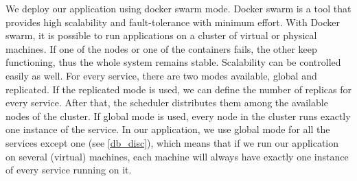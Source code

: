 We deploy our application using docker swarm mode. Docker swarm is a tool that provides high scalability and fault-tolerance with minimum effort. With Docker swarm, it is possible to run applications on a cluster of virtual or physical machines. If one of the nodes or one of the containers fails, the other keep functioning, thus the whole system remains stable. Scalability can be controlled easily as well. For every service, there are two modes available, global and replicated. If  the replicated mode is used, we can define the number of replicas for every service. After that, the scheduler distributes them among the available nodes of the cluster. If global mode is used, every node in the cluster runs exactly one instance of the service. In our application, we use global mode for all the services except one (see \ref{db_disc}), which means that if we run our application on several (virtual) machines, each machine will always have exactly one instance of every service running on it.
